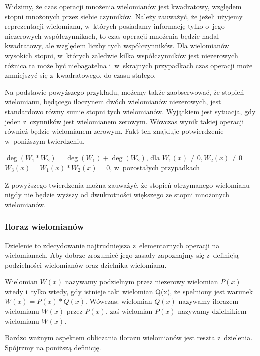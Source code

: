 Widzimy, że czas operacji mnożenia wielomianów jest kwadratowy, względem stopni mnożonych przez siebie czynników. Należy zauważyć, że jeżeli użyjemy reprezentacji wielomianu, w~których posiadamy informację tylko o~jego niezerowych współczynnikach, to czas operacji mnożenia będzie nadal kwadratowy, ale względem liczby tych współczynników. Dla wielomianów wysokich stopni, w~których zaledwie kilka współczynników jest niezerowych różnica ta może być niebagatelna i~w~skrajnych przypadkach czas operacji może zmniejszyć się z~kwadratowego, do czasu stałego.

Na podstawie powyższego przykładu, możemy także zaobserwować, że stopień wielomianu, będącego iloczynem dwóch wielomianów niezerowych, jest standardowo równy sumie stopni tych wielomianów. Wyjątkiem jest sytuacja, gdy jeden z~czynników jest wielomianem zerowym. Wówczas wynik takiej operacji również będzie wielomianem zerowym. Fakt ten znajduje potwierdzenie w~poniższym twierdzeniu.

\begin{theorem}
	$ $\\
	$\deg(W_1 * W_2) = \deg(W_1) + \deg(W_2)$, dla $W_1(x) \neq 0, W_2(x) \neq 0$\\
	$W_3(x) = W_1(x) * W_2(x) = 0$, w~pozostałych przypadkach
\end{theorem}

Z powyższego twierdzenia można zauważyć, że stopień otrzymanego wielomianu nigdy nie będzie wyższy od dwukrotności większego ze stopni mnożonych wielomianów.

\subsubsection{Iloraz wielomianów}

Dzielenie to zdecydowanie najtrudniejsza z~elementarnych operacji na wielomianach. Aby dobrze zrozumieć jego zasady zapoznajmy się z~definicją podzielności wielomianów oraz dzielnika wielomianu.

\begin{definition}
	$ $\\
	Wielomian $W(x)$ nazywamy podzielnym przez niezerowy wielomian $P(x)$ wtedy i~tylko wtedy, gdy istnieje taki wielomian Q(x), że spełniony jest warunek $W(x) = P(x) * Q(x)$. Wówczas: wielomian $Q(x)$ nazywamy ilorazem wielomianu $W(x)$ przez $P(x)$, zaś wielomian $P(x)$ nazywamy dzielnikiem wielomianu $W(x)$.
\end{definition}

Bardzo ważnym aspektem obliczania ilorazu wielomianów jest reszta z~dzielenia. Spójrzmy na poniższą definicję.

